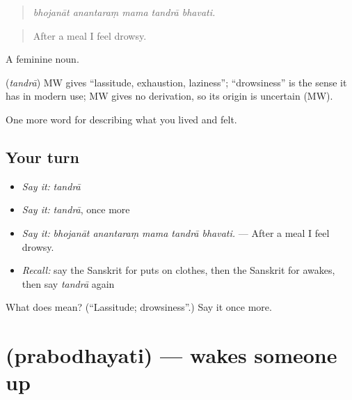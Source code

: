 \begin{quote}
    
\end{quote}

\begin{quote}
\emph{bhojanāt anantaraṃ mama tandrā bhavati.}
\end{quote}

\begin{quote}
After a meal I feel drowsy.
\end{quote}

A feminine noun.

\begin{cousinweb}
\textbf{} (\emph{tandrā}) MW gives \textquotedblleft{}lassitude, exhaustion, laziness\textquotedblright{}; \textquotedblleft{}drowsiness\textquotedblright{} is the sense it has in modern use; MW gives no derivation, so its origin is uncertain (MW).
\end{cousinweb}

\begin{grammarlens}[title={What you've built}]
One more word for describing what you lived and felt.
\end{grammarlens}

\subsection*{Your turn}
\begin{itemize}
\raggedright
  \item \emph{Say it:} \emph{tandrā}
  \item \emph{Say it:} \emph{tandrā}, once more
  \item \emph{Say it:} \emph{bhojanāt anantaraṃ mama tandrā bhavati.} — After a meal I feel drowsy.
  \item \emph{Recall:} say the Sanskrit for puts on clothes, then the Sanskrit for awakes, then say \emph{tandrā} again
\end{itemize}

\begin{tcolorbox}[breakable,colback=teal!4,colframe=teal!35!black,title={Before you move on}]
What does  mean? (\textquotedblleft{}Lassitude; drowsiness\textquotedblright{}.) Say it once more.
\end{tcolorbox}
\section[\texorpdfstring{\sk{प्रबोधयति} (prabodhayati)}{प्रबोधयति (prabodhayati)}]{ (prabodhayati) — wakes someone up}

